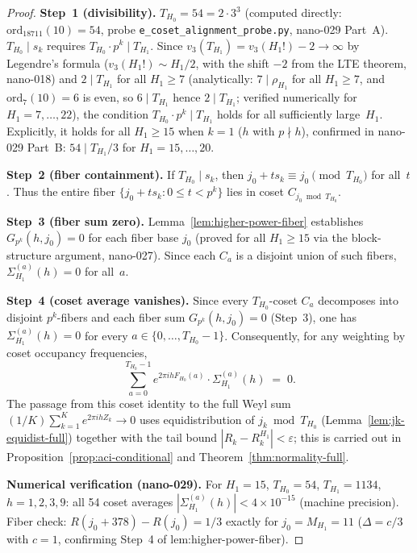 \documentclass[
]{article}
\begin{document}
\begin{proof}
\textbf{Step~1 (divisibility).}
$T_{H_0}=54=2\cdot 3^3$ (computed directly: $\mathrm{ord}_{18711}(10)=54$,
probe \texttt{e\_coset\_alignment\_probe.py}, nano-029 Part~A).
$T_{H_0}\mid s_k$ requires $T_{H_0}\cdot p^k\mid T_{H_1}$.
Since $v_3(T_{H_1})=v_3(H_1!)-2\to\infty$ by Legendre's formula
($v_3(H_1!)\sim H_1/2$, with the shift $-2$ from the LTE theorem, nano-018) and
$2\mid T_{H_1}$ for all $H_1\ge 7$ (analytically: $7\mid\rho_{H_1}$
for all $H_1\ge 7$, and $\mathrm{ord}_7(10)=6$ is even, so
$6\mid T_{H_1}$ hence $2\mid T_{H_1}$; verified numerically for $H_1=7,\ldots,22$), the condition
$T_{H_0}\cdot p^k\mid T_{H_1}$ holds for all sufficiently large~$H_1$.
Explicitly, it holds for all $H_1\ge 15$ when $k=1$ ($h$ with $p\nmid h$),
confirmed in nano-029 Part~B: $54\mid T_{H_1}/3$ for $H_1=15,\ldots,20$.

\textbf{Step~2 (fiber containment).}
If $T_{H_0}\mid s_k$, then $j_0+t s_k\equiv j_0\pmod{T_{H_0}}$ for all~$t$.
Thus the entire fiber $\{j_0+t s_k:0\le t<p^k\}$ lies in coset $C_{j_0\bmod T_{H_0}}$.

\textbf{Step~3 (fiber sum zero).}
Lemma~\ref{lem:higher-power-fiber} establishes $G_{p^k}(h,j_0)=0$ for
each fiber base $j_0$ (proved for all $H_1\ge 15$ via the block-structure
argument, nano-027).
Since each $C_a$ is a disjoint union of such fibers,
$\Sigma_{H_1}^{(a)}(h)=0$ for all~$a$.

\textbf{Step~4 (coset average vanishes).}
Since every $T_{H_0}$-coset $C_a$ decomposes into disjoint $p^k$-fibers
and each fiber sum $G_{p^k}(h,j_0)=0$ (Step~3), one has
$\Sigma_{H_1}^{(a)}(h)=0$ for every $a\in\{0,\ldots,T_{H_0}-1\}$.
Consequently, for any weighting by coset occupancy frequencies,
\[
  \sum_{a=0}^{T_{H_0}-1} e^{2\pi i h F_{H_0}(a)}\cdot\Sigma_{H_1}^{(a)}(h)
  \;=\;0.
\]
The passage from this coset identity to the full Weyl sum
$(1/K)\sum_{k=1}^K e^{2\pi ihZ_k}\to 0$ uses equidistribution of
$j_k\bmod T_{H_0}$ (Lemma~\ref{lem:jk-equidist-full}) together with
the tail bound $|R_k-R_k^{H_1}|<\varepsilon$; this is carried out in
Proposition~\ref{prop:aci-conditional} and Theorem~\ref{thm:normality-full}.

\textbf{Numerical verification (nano-029).}
For $H_1=15$, $T_{H_0}=54$, $T_{H_1}=1134$, $h=1,2,3,9$: all 54 coset averages
$|\Sigma_{H_1}^{(a)}(h)|<4\times 10^{-15}$ (machine precision).
Fiber check: $R(j_0+378)-R(j_0)=1/3$ exactly for $j_0=M_{H_1}=11$
($\Delta=c/3$ with $c=1$, confirming Step~4 of lem:higher-power-fiber).
\end{proof}
\end{document}
